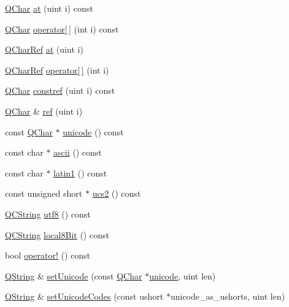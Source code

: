 \begin{DoxyCompactItemize}
\mbox{\hyperlink{class_q_char}{Q\+Char}} \mbox{\hyperlink{class_q_string_a5e35837892a410c0396af0cb5cd4a517}{at}} (uint i) const
\item 
\mbox{\hyperlink{class_q_char}{Q\+Char}} \mbox{\hyperlink{class_q_string_a2568867dc7f994e05c0e582fc510bbc2}{operator\mbox{[}$\,$\mbox{]}}} (int i) const
\item 
\mbox{\hyperlink{class_q_char_ref}{Q\+Char\+Ref}} \mbox{\hyperlink{class_q_string_a36f6c3019eb2c130513c0bbb6ec8ac35}{at}} (uint i)
\item 
\mbox{\hyperlink{class_q_char_ref}{Q\+Char\+Ref}} \mbox{\hyperlink{class_q_string_a9c1610733a6421ee92252b056a4e9288}{operator\mbox{[}$\,$\mbox{]}}} (int i)
\item 
\mbox{\hyperlink{class_q_char}{Q\+Char}} \mbox{\hyperlink{class_q_string_a4eb0e1874ad0605cfdaee56eda991ed1}{constref}} (uint i) const
\item 
\mbox{\hyperlink{class_q_char}{Q\+Char}} \& \mbox{\hyperlink{class_q_string_aeed075cd66817a54e5a2d55ec0e68f4d}{ref}} (uint i)
\item 
const \mbox{\hyperlink{class_q_char}{Q\+Char}} $\ast$ \mbox{\hyperlink{class_q_string_af653a95345ba3cd5bade2a1e07f2bb58}{unicode}} () const
\item 
const char $\ast$ \mbox{\hyperlink{class_q_string_aa86d59b310f60f4b0178f46eb6cb64d2}{ascii}} () const
\item 
const char $\ast$ \mbox{\hyperlink{class_q_string_af9cb186d8ba117c42f31e8235478fe68}{latin1}} () const
\item 
const unsigned short $\ast$ \mbox{\hyperlink{class_q_string_a25bed3caa16f09a748d9da0fdf4cea4a}{ucs2}} () const
\item 
\mbox{\hyperlink{class_q_c_string}{Q\+C\+String}} \mbox{\hyperlink{class_q_string_a6da42912db630af419d216aa0d321ebd}{utf8}} () const
\item 
\mbox{\hyperlink{class_q_c_string}{Q\+C\+String}} \mbox{\hyperlink{class_q_string_ac8aa3324210f474d9f515ba9f80b0f68}{local8\+Bit}} () const
\item 
bool \mbox{\hyperlink{class_q_string_a3c2e731ef300d9d649d976148f60f47c}{operator!}} () const
\item 
\mbox{\hyperlink{class_q_string}{Q\+String}} \& \mbox{\hyperlink{class_q_string_a220282acc5997df4e71e4e3a402bc8c4}{set\+Unicode}} (const \mbox{\hyperlink{class_q_char}{Q\+Char}} $\ast$\mbox{\hyperlink{class_q_string_af653a95345ba3cd5bade2a1e07f2bb58}{unicode}}, uint len)
\item 
\mbox{\hyperlink{class_q_string}{Q\+String}} \& \mbox{\hyperlink{class_q_string_a0c39790333795768528b58602afb36b9}{set\+Unicode\+Codes}} (const ushort $\ast$unicode\+\_\+as\+\_\+ushorts, uint len)

\end{DoxyCompactItemize}
